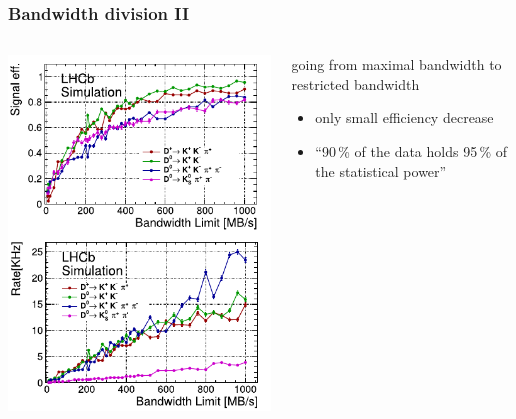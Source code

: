 \documentclass[table,xcolor=dvipsnames,professionalfonts]{beamer}
\begin{document}
\begin{frame}
  \frametitle{Bandwidth division II}
  \begin{columns}
    \begin{column}{.5\textwidth}
  \includegraphics[width=\textwidth]{./BW-trend.pdf}
    \end{column}
    \begin{column}{.5\textwidth}
      going from maximal bandwidth to restricted bandwidth
      \begin{itemize}
      \item only small efficiency decrease
      \item ``90\,\% of the data holds 95\,\% of the statistical power''
      \end{itemize}
    \end{column}
    \end{columns}
  \end{frame}
\end{document}
